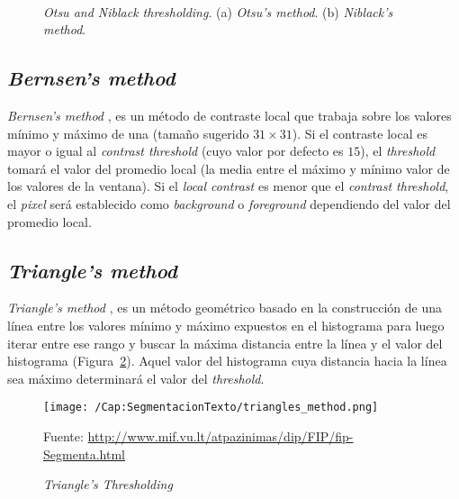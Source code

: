 \begin{figure}[h!]
	\centering
	\setlength{\fboxsep}{0pt}
   { }
   \\
  \caption[\textit{Otsu and Niblack thresholding}]{\textit{Otsu and Niblack 
  thresholding}. (a) \textit{Otsu's method}. (b) \textit{Niblack's method}.}
	\label{Fig:Cap-segmentaciontexto:thresholdingA}
\end{figure}

\subsection{\textit{Bernsen's method}}
\textit{Bernsen's method} \cite{Bernsen:1986:DTofGI}, es un método de 
contraste local que trabaja sobre los valores mínimo y máximo de una (tamaño
sugerido $31 \times 31$). Si el contraste local es mayor o igual al
\textit{contrast threshold} (cuyo valor por defecto es $15$), el
\textit{threshold} tomará el valor del promedio local (la media entre el máximo
y mínimo valor de los valores de la ventana). Si el \textit{local contrast} es
menor que el \textit{contrast threshold}, el \textit{pixel} será establecido
como \textit{background} o \textit{foreground} dependiendo del valor del
promedio local.

\subsection{\textit{Triangle's method}}
\textit{Triangle's method} \cite{Zack:1977:AMofSCRF}, es un método geométrico 
basado en la construcción de una línea entre los valores mínimo y máximo
expuestos en el histograma para luego iterar entre ese rango y buscar la máxima
distancia entre la línea y el valor del histograma
(Figura~\ref{Fig:Cap-segmentaciontexto:triangle}). Aquel valor del histograma
cuya distancia hacia la línea sea máximo determinará el valor del
\textit{threshold}.
\begin{figure}[h]
	\centering
	\texttt{[image: /Cap:SegmentacionTexto/triangles\_method.png]}
  \caption[\textit{Triangle's Thresholding}.]{\textit{Triangle's 
  Thresholding}}\tiny{Fuente:
\url{http://www.mif.vu.lt/atpazinimas/dip/FIP/fip-Segmenta.html}}
	\label{Fig:Cap-segmentaciontexto:triangle}
\end{figure}

